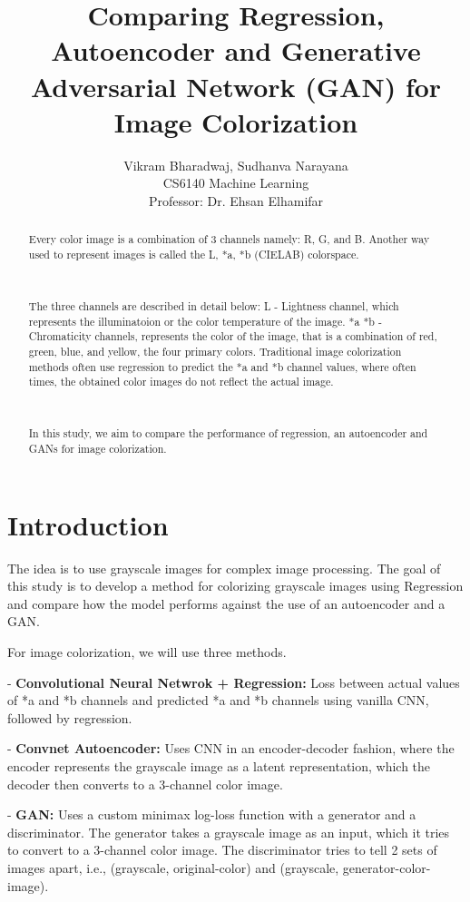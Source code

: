 \documentclass{article}
\title{Comparing Regression, Autoencoder and Generative
Adversarial Network (GAN) for Image Colorization}
\author{Vikram Bharadwaj, Sudhanva Narayana \\ 
        CS6140 Machine Learning \\
        Professor: Dr. Ehsan Elhamifar \\}
\begin{document}
\maketitle

\begin{abstract}
    Every color image is a combination of 3 channels namely: R, G, and B. Another
    way used to represent images is called the L, *a, *b (CIELAB) colorspace.

    \

    The three channels are described in detail below:
    L - Lightness channel, which represents the illuminatoion or the color temperature of the image.
    *a *b - Chromaticity channels, represents the color of the image, that is a
    combination of red, green, blue, and yellow, the four primary colors.
    Traditional image colorization methods often use regression to predict the *a and *b
    channel values, where often times, the obtained color images do not reflect the actual
    image. 
    
    \
    
    In this study, we aim to compare the performance of regression, an autoencoder
    and GANs for image colorization.
\end{abstract}

\section{Introduction}

The idea is to use grayscale images for complex image processing. The goal of this
study is to develop a method for colorizing grayscale images using Regression and
compare how the model performs against the use of an autoencoder and a GAN. 

For image colorization, we will use three methods.

- \textbf{Convolutional Neural Netwrok + Regression:} Loss between actual values of *a and *b channels and predicted *a and *b channels using vanilla CNN, followed by regression.

- \textbf{Convnet Autoencoder:} Uses CNN in an encoder-decoder fashion, where the encoder represents the grayscale image as a latent representation, which the decoder then converts to a 3-channel color image.

- \textbf{GAN:}  Uses a custom minimax log-loss function with a generator and a discriminator. The generator takes a grayscale image as an input, which it tries to convert to a 3-channel color image. The discriminator tries to tell 2 sets of images apart, i.e., (grayscale, original-color) and (grayscale, generator-color-image).
\end{document}
